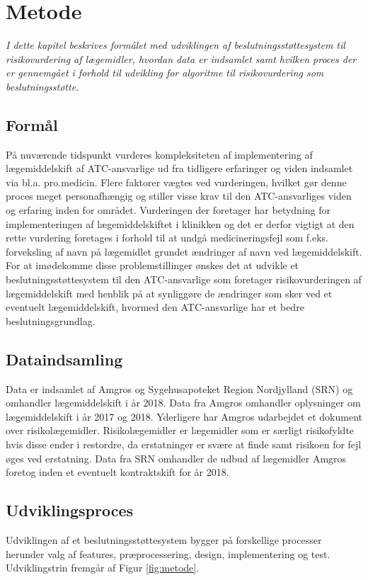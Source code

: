 \chapter{Metode}
\textit{I dette kapitel beskrives formålet med udviklingen af beslutningsstøttesystem til risikovurdering af lægemidler, hvordan data er indsamlet samt hvilken proces der er gennemgået i forhold til udvikling for algoritme til risikovurdering som beslutningsstøtte.}

\section{Formål}
På nuværende tidspunkt vurderes kompleksiteten af implementering af lægemiddelskift af ATC-ansvarlige ud fra tidligere erfaringer og viden indsamlet via bl.a. pro.medicin. Flere faktorer vægtes ved vurderingen, hvilket gør denne proces meget personafhængig og stiller visse krav til den ATC-ansvarliges viden og erfaring inden for området. Vurderingen der foretager har betydning for implementeringen af lægemiddelskiftet i klinikken og det er derfor vigtigt at den rette vurdering foretages i forhold til at undgå medicineringsfejl som f.eks. forveksling af navn på lægemidlet grundet ændringer af navn ved lægemiddelskift.
For at imødekomme disse problemstillinger ønskes det at udvikle et beslutningsstøttesystem til den ATC-ansvarlige som foretager risikovurderingen af lægemiddelskift med henblik på at synliggøre de ændringer som sker ved et eventuelt lægemiddelskift, hvormed den ATC-ansvarlige har et bedre beslutningsgrundlag.

\section{Dataindsamling}
Data er indsamlet af Amgros og Sygehusapoteket Region Nordjylland (SRN) og omhandler lægemiddelskift i år 2018. Data fra Amgros omhandler oplysninger om lægemiddelskift i år 2017 og 2018. Yderligere har Amgros udarbejdet et dokument over risikolægemidler. Risikolægemidler er lægemidler som er særligt risikofyldte hvis disse ender i restordre, da erstatninger er svære at finde samt risikoen for fejl øges ved erstatning. Data fra SRN omhandler de udbud af lægemidler Amgros foretog inden et eventuelt kontraktskift for år 2018. 


\section{Udviklingsproces}
Udviklingen af et beslutningsstøttesystem bygger på forskellige processer herunder valg af features, præprocessering, design, implementering og test. Udviklingstrin fremgår af Figur \ref{fig:metode}.

